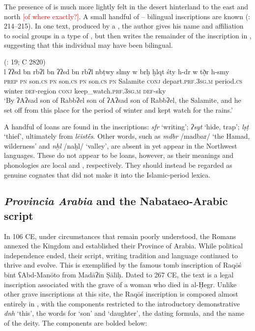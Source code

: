 \documentclass[output=paper]{langsci/langscibook}
\begin{document}
The presence of  is much more lightly felt in the desert hinterland to the east and north \textcolor{red}{[of where exactly?]}. A small handful of -- bilingual inscriptions are known (\citealt{Hayajneh2009}: 214--215). In one  text, produced by a , the author gives his name and affiliation to social groups in a type of , but then writes the remainder of the inscription in  , suggesting that this individual may have been bilingual. 

\ea {}  (\citealt{Al-Jallad2015Safaitic}: 19; C 2820) \\ 
\gll l ʔʔsd bn rbʔl bn ʔʔsd bn rbʔl nbṭwy slmy w brḥ ḫlqt śty h-dr w tð̣r h-smy \\
\textsc{prep} \textsc{pn} son.\textsc{cs} \textsc{pn} son.\textsc{cs} \textsc{pn} son.\textsc{cs} \textsc{pn}  Salamite \textsc{conj} depart.\textsc{prf.3sg.m} period.\textsc{cs} winter \textsc{def}-region \textsc{conj} keep\_watch.\textsc{prf.3sg.m} \textsc{def}-sky \\
\glt `By ʔAʔsad son of Rabbʔel son of  ʔAʔsad son of Rabbʔel, the  Salamite, and he set off from this place for the period of winter and kept watch for the rains.' \\
\z

A handful of  loans are found in the  inscriptions: \textit{sfr} ‘writing’; \textit{ʔsyt} ‘hide, trap’; \textit{lṣṭ} ‘thief’, ultimately from  \textit{lēistḗs}. Other words, such as \textit{mdbr} /madbar/ ‘the Hamad, wilderness’ and \textit{nḫl} /naḫl/ ‘valley’, are absent in   yet appear in the Northwest  languages. These do not appear to be loans, however, as their meanings and phonologies are local and , respectively. They should instead be regarded as genuine cognates that did not make it into the Islamic-period lexica. 

\subsection{\textit{Provincia Arabia} and the Nabataeo-Arabic script}\label{Provincia}
In 106 CE, under circumstances that remain poorly understood, the Romans annexed the  Kingdom and established their Province of Arabia. While  political independence ended, their script, writing tradition and language continued to thrive and evolve. This is exemplified by the famous tomb inscription of Raqōś bint ʕAbd-Manōto from Madāʔin Ṣāliḥ. Dated to 267 CE, the text is a legal inscription associated with the grave of a woman who died in al-Ḥegr. Unlike other grave inscriptions at this site, the Raqōś inscription is composed almost entirely in , with the  components restricted to the introductory demonstrative \textit{dnh} ‘this’, the words for ‘son’ and ‘daughter’, the dating formula, and the name of the deity. The  components are bolded below:
\end{document}
